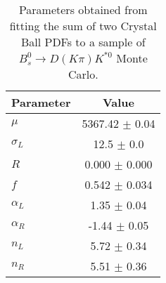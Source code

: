 \begin{table}[h]
  \centering
  \begin{tabular}{lc}
      \toprule
      Parameter & Value \\
      \midrule
      $\mu$ & 5367.42 $\pm$ 0.04 \\
      $\sigma_L$ & 12.5 $\pm$ 0.0 \\
      $R$ & 0.000 $\pm$ 0.000 \\
      $f$ & 0.542 $\pm$ 0.034 \\
      $\alpha_L$ & 1.35 $\pm$ 0.04 \\
      $\alpha_R$ & -1.44 $\pm$ 0.05 \\
      $n_L$ & 5.72 $\pm$ 0.34 \\
      $n_R$ & 5.51 $\pm$ 0.36 \\
  \bottomrule
  \end{tabular}
  \caption{Parameters obtained from fitting the sum of two Crystal Ball PDFs to a sample of $B^0_s \to D(K\pi)K^{*0}$ Monte Carlo.}
\label{tab:signal_Bs_MC_params}
\end{table}
